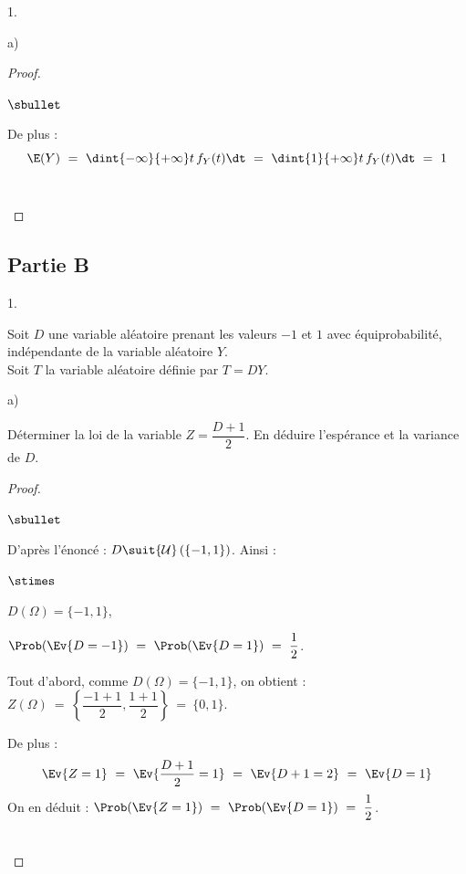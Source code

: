 \documentclass[11pt]{article}%
\begin{document}
\begin{noliste}{1.}
\begin{noliste}{a)}
\begin{proof}
\begin{noliste}{$\sbullet$}
      \item De plus :
        \[
        \E(Y) \ = \ \dint{-\infty}{+\infty} t \, f_Y(t) \dt \ = \
        \dint{1}{+\infty} t \, f_Y(t) \dt \ = \ 1
        \]
        ~\\[-1.4cm]
      \end{noliste}
    \end{proof}
  \end{noliste}
\end{noliste}

 


\subsection*{Partie B} 

\begin{noliste}{1.}
  \setlength{\itemsep}{4mm} %
  \setcounter{enumi}{5}
\item Soit $D$ une variable aléatoire prenant les valeurs $-1$ et $1$
  avec équiprobabilité, indépendante de la variable aléatoire $Y$.\\
  Soit $T$ la variable aléatoire définie par $T=DY$.
  \begin{noliste}{a)}
    \setlength{\itemsep}{2mm}
  \item Déterminer la loi de la variable $Z = \dfrac{D+1}{2}$. En
    déduire l'espérance et la variance de $D$.

    \begin{proof}~
      \begin{noliste}{$\sbullet$}
      \item D'après l'énoncé : $D \suit {\cal
          U}\left(\{-1,1\}\right)$. Ainsi :
        \begin{noliste}{$\stimes$}
        \item $D(\Omega) = \{-1,1\}$,
            
        \item $\Prob(\Ev{D = -1}) \ = \ \Prob(\Ev{ D = 1}) \ = \
          \dfrac{1}{2}$.
        \end{noliste}

      \item Tout d'abord, comme $D(\Omega) = \{-1, 1\}$, on obtient :
        $Z(\Omega) \ = \ \left\{ \dfrac{-1+1}{2},
          \dfrac{1+1}{2}\right\} \ = \ \{0,1\}$.
          
      \item De plus :
        \[
        \Ev{Z = 1} \ = \ \Ev{ \dfrac{D+1}{2} = 1} \ = \ \Ev{ D+1 =
          2} \ = \ \Ev{D = 1}
        \]
        On en déduit : $\Prob(\Ev{Z= 1}) \ = \ \Prob(\Ev{D = 1}) \ =
        \ \dfrac{1}{2}$.
      \end{noliste}
      ~\\[-1cm]
    \end{proof}
    

\end{noliste}
\end{noliste}
\end{document}
